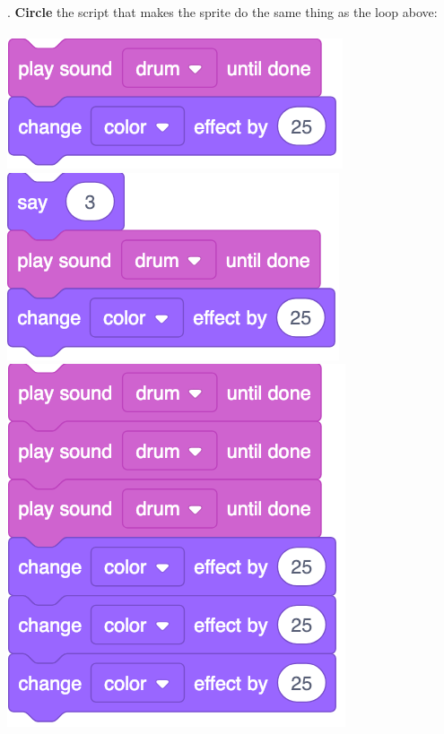 \documentclass[letterpaper,12pt]{article}
\begin{document}
. \textbf{Circle} the script that makes the sprite do the same thing as the loop above: \\ \\
\includegraphics[scale=.25,valign=t]{q4_script1.png} \hspace{1.25cm}
\includegraphics[scale=.25,valign=t]{q4_script2.png} \hspace{1.25cm}
\includegraphics[scale=.25,valign=t]{q4_script3.png} \hspace{1.25cm}
\end{document}
